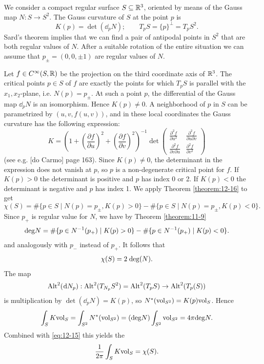 \begin{example}\label{example:12-18}
  We consider a compact regular surface $S\subseteq{\ensuremath{\mathbb{R}}}^3$, oriented by means of the Gauss 
  map $N: S\to S^2$. The Gauss curvature of $S$ at the point $p$ is
  \[
    K(p) = \det(\!\dd_pN);\qquad T_pS = \{p\}^\perp = T_pS^2.
  \]
  Sard's theorem implies that we can find a pair of antipodal points in $S^2$ that are
  both regular values of $N$. After a suitable rotation of the entire situation we can
  assume that $p_\pm = (0, 0, \pm1)$ are regular values of $N$.

  Let $f\in C^\infty(S, {\mathbb{R}})$ be the projection on the third coordinate axis of ${\mathbb{R}}^3$. The
  critical points $p\in S$ of $f$ are exactly the points for which $T_pS$ is parallel with
  the $x_1, x_2$-plane, i.e. $N(p) = p_\pm$. At such a point $p$, the differential of the Gauss
  map $\dd_pN$ is an isomorphism. Hence $K(p)\neq 0$. A neighborhood of $p$ in $S$ can be
  parametrized by $(u, v, f (u, v))$, and in these local coordinates the Gauss curvature
  has the following expression:
  \[
    K = \left(1+\left(\frac{\partial f }{\partial u }\right)^2 + \left(\frac{\partial f }{\partial v }\right)^2\right)^{-1}
    \det\begin{pmatrix}
      \frac{\partial^2 f}{\partial u^2} & \frac{\partial^2 f}{\partial u\partial v}\\[.75em]
      \frac{\partial^2 f}{\partial v\partial u} & \frac{\partial^2 f}{\partial v^2}
    \end{pmatrix}
  \]
  (see e.g. [do Carmo] page 163). Since $K(p)\neq 0$, the determinant in the expression
  does not vanish at $p$, so $p$ is a non-degenerate critical point for $f$. If $K(p) > 0$
  the determinant is positive and $p$ has index 0 or 2. If $K(p) < 0$ the determinant
  is negative and $p$ has index 1. We apply Theorem \ref{theorem:12-16} to get
  \[
    \chi(S) = \#\{p\in S \mid N(p)=p_\pm, K(p)>0\} 
    - \#\{p\in S \mid N(p)=p_\pm, K(p)<0\}.
  \]
  Since $p_+$ is regular value for $N$, we have by Theorem \ref{theorem:11-9}
  \[
    \mathrm{deg}{N} = \#\{p\in N^{-1}(p_+)\mid K(p)>0\}
    - \#\{p\in N^{-1}(p_+)\mid K(p)<0\}.
  \]
  and analogously with $p_{-}$ instead of $p_+$. It follows that
  \begin{align}\label{eq:12-15}
    \chi(S) = 2\;\mathrm{deg}(N).
  \end{align}
  The map 
  \[
    \alt^2(\!\dd N_p):\alt^2(T_{N_p}S^2) 
    = \alt^2(T_pS)\to\alt^2(T_p(S))
  \]
  is multiplication by $\det(\!\dd_pN) = K(p)$, so $N^*(\mathrm{vol}_{S^2})=K(p)\mathrm{vol}_S$. Hence 
  \[
    \int_S K\mathrm{vol}_S 
    = \int_{S^2} N^*(\mathrm{vol}_{S^2})
    = (\mathrm{deg}N)\int_{S^2}\mathrm{vol}_{S^2}
    = 4\pi \mathrm{deg}N.
  \]
  Combined with \eqref{eq:12-15} this yields the 
  \begin{align}\label{eq:12-16}
    \frac1{2\pi}\int_S K\mathrm{vol}_S = \chi(S).
  \end{align}
\end{example}

